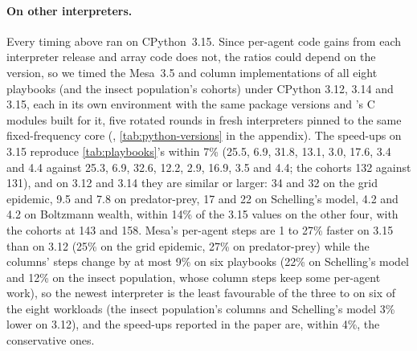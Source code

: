 \paragraph{On other interpreters.}
\label{sec:python-versions}
Every timing above ran on CPython~3.15. Since per-agent code gains from each interpreter
release and array code does not, the ratios could depend on the version, so we timed the
Mesa~3.5 and column implementations of all eight playbooks (and the insect population's
cohorts) under CPython 3.12, 3.14 and 3.15, each in its own environment with the same
package versions and \modelly{}'s C modules built for it, five rotated rounds in fresh
interpreters pinned to the same fixed-frequency core
(, \cref{tab:python-versions} in the appendix). The
speed-ups on 3.15 reproduce \cref{tab:playbooks}'s within 7\% (25.5, 6.9,
31.8, 13.1, 3.0, 17.6, 3.4 and 4.4 against 25.3, 6.9, 32.6, 12.2, 2.9, 16.9, 3.5 and 4.4;
the cohorts 132 against 131), and on 3.12 and 3.14 they are similar or larger: 34 and 32
on the grid epidemic, 9.5 and 7.8 on predator-prey, 17 and 22 on Schelling's model, 4.2 and
4.2 on Boltzmann wealth, within 14\% of the 3.15 values on the other four, with the
cohorts at 143 and 158. Mesa's per-agent steps are 1 to 27\% faster on 3.15 than on 3.12
(25\% on the grid epidemic, 27\% on predator-prey) while the columns' steps change by at
most 9\% on six playbooks (22\% on Schelling's model and 12\% on the insect population,
whose column steps keep some per-agent work), so the newest interpreter is the least
favourable of the three to \modelly{} on six of the eight workloads (the insect
population's columns and Schelling's model 3\% lower on 3.12), and the speed-ups reported in
the paper are, within 4\%, the conservative ones.

